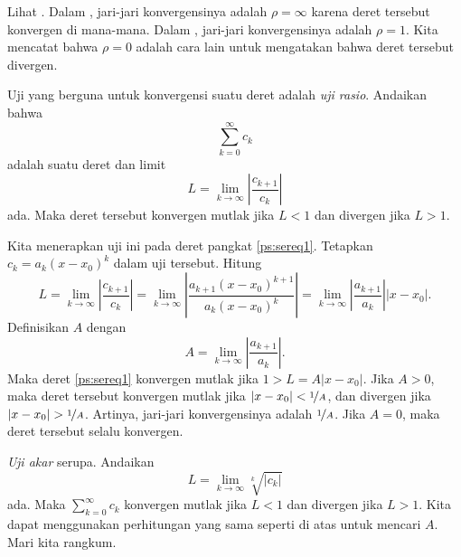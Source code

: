 Lihat .
Dalam , jari-jari konvergensinya adalah $\rho = \infty$
karena deret tersebut konvergen di mana-mana.
Dalam , jari-jari konvergensinya adalah $\rho=1$.
Kita mencatat bahwa $\rho = 0$ adalah cara lain untuk mengatakan bahwa deret tersebut
divergen.

Uji yang berguna untuk konvergensi suatu deret adalah
\emph{uji rasio}. Andaikan bahwa
\begin{equation*}
\sum_{k=0}^\infty c_k
\end{equation*}
adalah suatu deret dan limit
\begin{equation*}
L = \lim_{k\to\infty} \left \lvert \frac{c_{k+1}}{c_k} \right \rvert
\end{equation*}
ada. Maka deret tersebut konvergen mutlak jika $L < 1$ dan divergen
jika $L > 1$.

Kita menerapkan uji ini pada deret pangkat \eqref{ps:sereq1}. 
Tetapkan $c_k = a_k {(x - x_0)}^k$ dalam uji tersebut. Hitung
\begin{equation*}
L = \lim_{k\to\infty} \left \lvert \frac{c_{k+1}}{c_k} \right \rvert
=
\lim_{k\to\infty} \left \lvert
\frac{a_{k+1} {(x - x_0)}^{k+1}}{a_k {(x - x_0)}^k}
\right \rvert
=
\lim_{k\to\infty} \left \lvert
\frac{a_{k+1}}{a_k}
\right \rvert
\lvert  x - x_0 \rvert .
\end{equation*}
Definisikan $A$ dengan
\begin{equation*}
A =
\lim_{k\to\infty} \left \lvert
\frac{a_{k+1}}{a_k}
\right \rvert .
\end{equation*}
Maka deret \eqref{ps:sereq1}
konvergen mutlak jika $1 > L = A \lvert x - x_0 \rvert$.
Jika $A > 0$, maka
deret tersebut konvergen mutlak
jika $\lvert x - x_0 \rvert < \nicefrac{1}{A}$,
dan divergen jika $\lvert x - x_0 \rvert > \nicefrac{1}{A}$. Artinya,
jari-jari konvergensinya adalah $\nicefrac{1}{A}$.
Jika $A = 0$, maka deret tersebut selalu konvergen.

\emph{Uji akar} serupa.
Andaikan
\begin{equation*}
L = \lim_{k\to\infty} \sqrt[k]{\lvert c_k \rvert}
\end{equation*}
ada. Maka $\sum_{k=0}^\infty c_k$ konvergen mutlak jika $L < 1$
dan divergen jika $L > 1$. Kita dapat menggunakan perhitungan yang sama seperti di atas
untuk mencari $A$.
Mari kita rangkum.

